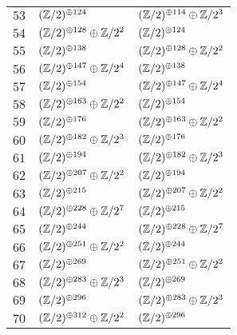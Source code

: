 \begin{supertabular}{|c|p{5.5cm}|p{5.5cm}|}
$53$%
&$(\mathbb{Z}/2)^{\oplus124}$%
&$(\mathbb{Z}/2)^{\oplus114}\oplus\mathbb{Z}/2^{3}$\\

$54$%
&$(\mathbb{Z}/2)^{\oplus128}\oplus\mathbb{Z}/2^{2}$%
&$(\mathbb{Z}/2)^{\oplus124}$\\

$55$%
&$(\mathbb{Z}/2)^{\oplus138}$%
&$(\mathbb{Z}/2)^{\oplus128}\oplus\mathbb{Z}/2^{2}$\\

$56$%
&$(\mathbb{Z}/2)^{\oplus147}\oplus\mathbb{Z}/2^{4}$%
&$(\mathbb{Z}/2)^{\oplus138}$\\

$57$%
&$(\mathbb{Z}/2)^{\oplus154}$%
&$(\mathbb{Z}/2)^{\oplus147}\oplus\mathbb{Z}/2^{4}$\\

$58$%
&$(\mathbb{Z}/2)^{\oplus163}\oplus\mathbb{Z}/2^{2}$%
&$(\mathbb{Z}/2)^{\oplus154}$\\

$59$%
&$(\mathbb{Z}/2)^{\oplus176}$%
&$(\mathbb{Z}/2)^{\oplus163}\oplus\mathbb{Z}/2^{2}$\\

$60$%
&$(\mathbb{Z}/2)^{\oplus182}\oplus\mathbb{Z}/2^{3}$%
&$(\mathbb{Z}/2)^{\oplus176}$\\

$61$%
&$(\mathbb{Z}/2)^{\oplus194}$%
&$(\mathbb{Z}/2)^{\oplus182}\oplus\mathbb{Z}/2^{3}$\\

$62$%
&$(\mathbb{Z}/2)^{\oplus207}\oplus\mathbb{Z}/2^{2}$%
&$(\mathbb{Z}/2)^{\oplus194}$\\

$63$%
&$(\mathbb{Z}/2)^{\oplus215}$%
&$(\mathbb{Z}/2)^{\oplus207}\oplus\mathbb{Z}/2^{2}$\\

$64$%
&$(\mathbb{Z}/2)^{\oplus228}\oplus\mathbb{Z}/2^{7}$%
&$(\mathbb{Z}/2)^{\oplus215}$\\

$65$%
&$(\mathbb{Z}/2)^{\oplus244}$%
&$(\mathbb{Z}/2)^{\oplus228}\oplus\mathbb{Z}/2^{7}$\\

$66$%
&$(\mathbb{Z}/2)^{\oplus251}\oplus\mathbb{Z}/2^{2}$%
&$(\mathbb{Z}/2)^{\oplus244}$\\

$67$%
&$(\mathbb{Z}/2)^{\oplus269}$%
&$(\mathbb{Z}/2)^{\oplus251}\oplus\mathbb{Z}/2^{2}$\\

$68$%
&$(\mathbb{Z}/2)^{\oplus283}\oplus\mathbb{Z}/2^{3}$%
&$(\mathbb{Z}/2)^{\oplus269}$\\

$69$%
&$(\mathbb{Z}/2)^{\oplus296}$%
&$(\mathbb{Z}/2)^{\oplus283}\oplus\mathbb{Z}/2^{3}$\\

$70$%
&$(\mathbb{Z}/2)^{\oplus312}\oplus\mathbb{Z}/2^{2}$%
&$(\mathbb{Z}/2)^{\oplus296}$\\


\end{supertabular}
